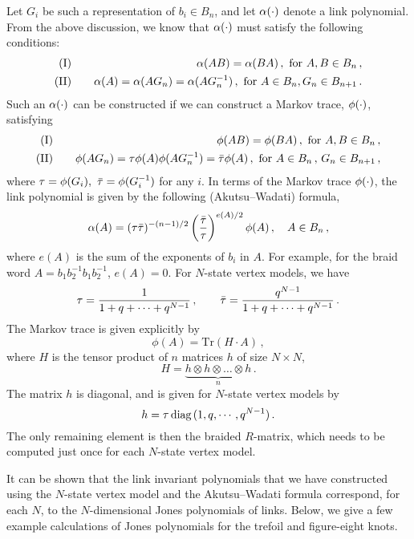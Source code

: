 \documentclass[11pt]{article}
\begin{document}
Let $G_i$ be such a representation of $b_i\in B_n$, and let $\alpha(\cdot)$ denote a link polynomial. From the above discussion, we know that $\alpha(\cdot)$ must satisfy the following conditions:
\begin{eqnarray}
	\text{(I)} &\quad& \alpha(AB) = \alpha(BA) \,, \text{ for } A,B\in B_n \,, \\
	\text{(II)} &\quad& \alpha(A)= \alpha(AG_n)=\alpha(AG_n^{-1}) \,, \text{ for } A\in B_n,G_n\in B_{n+1} \,.
\end{eqnarray}
Such an $\alpha(\cdot)$ can be constructed if we can construct a Markov trace, $\phi(\cdot)$, satisfying
\begin{eqnarray}
	\text{(I)} &\quad& \phi(AB) = \phi(BA) \,, \text{ for } A,B\in B_n \,, \\
	\text{(II)} &\quad& \phi(A G_n) = \tau\phi(A) \phi(AG_n^{-1})=\bar{\tau}\phi(A) \,, \text{ for } A\in B_n\,,\,G_n\in B_{n+1} \,,
\end{eqnarray}
where $\t=\f(G_i),\ \bar\t=\f(G_i^{-1})$ for any $i$. In terms of the Markov trace $\phi(\cdot)$, the link polynomial is given by the following (Akutsu--Wadati) formula,
\begin{equation}
	\alpha(A) = (\tau\bar{\tau})^{-(n-1)/2}\left (\frac{\bar{\tau}}{\tau}\right )^{e(A)/2}\phi(A) \,, \quad A\in B_n \,,
\end{equation}
where $e(A)$ is the sum of the exponents of $b_i$ in $A$. For example, for the braid word $A=b_1 b_2^{-1} b_1 b_2^{-1}$, $e(A)=0$.
For $N$-state vertex models, we have~\cite{Akutsu:1987dz,Akutsu:1987qs}
\begin{equation}
	\tau = \frac1{1+q+\cdots+q^{N-1}}\,, \qquad \bar{\tau} = \frac{q^{N-1}}{1+q+\cdots+q^{N-1}}\, .
\end{equation}
The Markov trace is given explicitly by
\begin{equation}
	\phi(A) = \text{Tr}(H \cdot A) \,,
\end{equation}
where $H$ is the tensor product of $n$ matrices $h$ of size $N\times N$,
\begin{equation}
	H = \underbrace{h \otimes h \otimes \dots \otimes h}_n \,.
\end{equation}
The matrix $h$ is diagonal, and is given for $N$-state vertex models by
\begin{equation}
	h = \tau\,\text{diag}\,(1,q,\cdots,q^{N-1}) \,.
\end{equation}
The only remaining element is then the braided $R$-matrix, which needs to be computed just once for each $N$-state vertex model. 

It can be shown that the link invariant polynomials that we have constructed using the $N$-state vertex model and the Akutsu--Wadati formula correspond, for each $N$, to the $N$-dimensional Jones polynomials of links. Below, we give a few example calculations of Jones polynomials for the trefoil and figure-eight knots.
\end{document}
